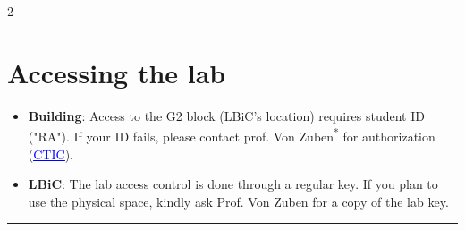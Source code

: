 \documentclass[a4paper, landscape]{article}
\begin{document}
\begin{multicols}{2}
\raggedcolumns
\section*{Accessing the lab}
\label{sec:orgab5b26a}
\vspace{-2mm}
\begin{itemize}
\item \textbf{Building}: Access to the G2 block (LBiC's location) requires student ID ("RA"). If your ID fails, please contact prof. Von Zuben\textsuperscript{*} for authorization (\href{https://site.fee.unicamp.br/ctic/faq\detokenize{#}acesso_laboratorio}{\textcolor{blue}{\uline{CTIC}}}).
\item \textbf{LBiC}: The lab access control is done through a regular key. If you plan to use the physical space, kindly ask Prof. Von Zuben for a copy of the lab key.
\end{itemize}

\vspace{-1em}\noindent\rule{\linewidth}{0.4pt}\vspace{-1.25em}

\end{multicols}
\end{document}
